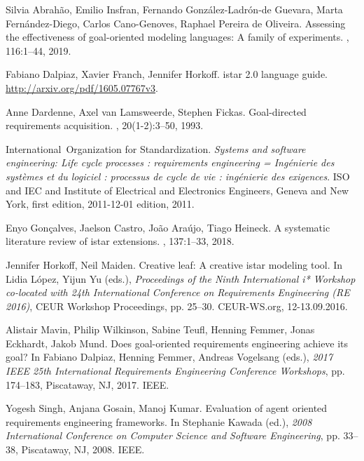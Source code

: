 \documentclass[11pt,a4paper]{article}
\begin{document}

\begin{thebibliography}{xxx}
 Silvia Abrah{\~a}o, Emilio Insfran, Fernando
  Gonz{\'a}lez-Ladr{\'o}n-de Guevara, Marta Fern{\'a}ndez-Diego, Carlos
  Cano-Genoves, Raphael {Pereira de Oliveira}.  \newblock Assessing the
  effectiveness of goal-oriented modeling languages: A family of experiments.
  , 116:1--44, 2019.

 Fabiano Dalpiaz, Xavier Franch, Jennifer Horkoff.
  \newblock istar 2.0 language guide.  \newblock
  \url{http://arxiv.org/pdf/1605.07767v3}.

 Anne Dardenne, Axel {van Lamsweerde}, Stephen Fickas.
  \newblock Goal-directed requirements acquisition.  , 20(1-2):3--50, 1993.

 International~Organization for Standardization.  \newblock
  {\em Systems and software engineering: Life cycle processes : requirements
    engineering = Ing{\'e}nierie des syst{\`e}mes et du logiciel : processus
    de cycle de vie : ing{\'e}nierie des exigences}.  \newblock ISO and IEC
  and {Institute of Electrical and Electronics Engineers}, Geneva and New
  York, first edition, 2011-12-01 edition, 2011.

 Enyo Gon{\c{c}}alves, Jaelson Castro, Jo{\~a}o
  Ara{\'u}jo, Tiago Heineck.  \newblock A systematic literature review of
  istar extensions.  ,
  137:1--33, 2018.

 Jennifer Horkoff, Neil Maiden.  \newblock
  Creative leaf: A creative istar modeling tool.  \newblock In Lidia
  L{\'o}pez, Yijun Yu (eds.), {\em Proceedings of the Ninth International i*
    Workshop co-located with 24th International Conference on Requirements
    Engineering (RE 2016)}, CEUR Workshop Proceedings, pp. 25--30.
  CEUR-WS.org, 12-13.09.2016.

 Alistair Mavin, Philip Wilkinson, Sabine Teufl, Henning
  Femmer, Jonas Eckhardt, Jakob Mund.  \newblock Does goal-oriented
  requirements engineering achieve its goal?  \newblock In Fabiano Dalpiaz,
  Henning Femmer, Andreas Vogelsang (eds.), {\em 2017 IEEE 25th International
    Requirements Engineering Conference Workshops}, pp. 174--183, Piscataway,
  NJ, 2017. IEEE.

 Yogesh Singh, Anjana Gosain, Manoj Kumar.  \newblock
  Evaluation of agent oriented requirements engineering frameworks.  \newblock
  In Stephanie Kawada (ed.), {\em 2008 International Conference on Computer
    Science and Software Engineering}, pp. 33--38, Piscataway, NJ, 2008. IEEE.


\end{thebibliography}
\end{document}
